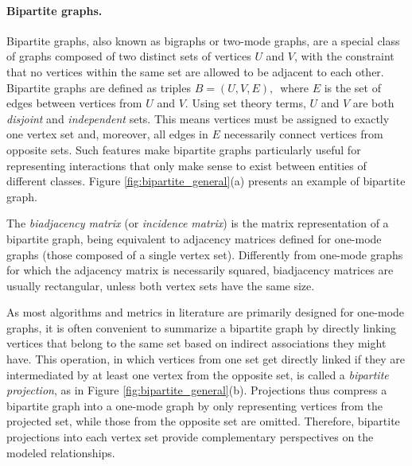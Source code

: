 \paragraph*{Bipartite graphs.}
Bipartite graphs, also known as bigraphs or two-mode graphs, are a special class of graphs composed of two distinct sets of vertices $U$ and $V$, with the constraint that no vertices within the same set are allowed to be adjacent to each other. 
Bipartite graphs are defined as triples 
$
B = (U, V, E) \mbox{, }
$
where $E$ is the set of edges between vertices from $U$ and $V$.
Using set theory terms, $U$ and $V$ are both \textit{disjoint} and \textit{independent} sets.
This means vertices must be assigned to exactly one vertex set and, moreover, all edges in $E$ necessarily connect vertices from opposite sets. 
Such features make bipartite graphs particularly useful for representing interactions that only make sense to exist between entities of different classes. Figure \ref{fig:bipartite_general}(a) presents an example of bipartite graph.

The \textit{biadjacency matrix} (or \textit{incidence matrix}) is the matrix representation of a bipartite graph, being equivalent to adjacency matrices defined for one-mode graphs (those composed of a single vertex set). 
Differently from one-mode graphs for which the adjacency matrix is necessarily squared, biadjacency matrices are usually rectangular, unless both vertex sets have the same size.

As most algorithms and metrics in literature are primarily designed for one-mode graphs, it is often convenient to summarize a bipartite graph by directly linking vertices that belong to the same set based on indirect associations they might have. 
This operation, in which vertices from one set get directly linked if they are intermediated by at least one vertex from the opposite set, is called a \textit{bipartite projection}, as in Figure \ref{fig:bipartite_general}(b).
Projections thus compress a bipartite graph into a one-mode graph by only representing vertices from the projected set, while those from the opposite set are omitted.
Therefore, bipartite projections into each vertex set provide complementary perspectives on the modeled relationships.
%

